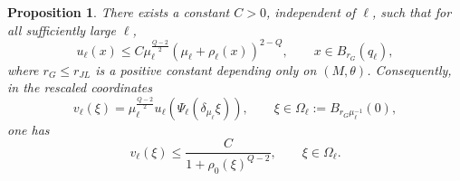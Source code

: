 \documentclass[11pt]{article}
\numberwithin{equation}{section}
\newtheorem{proposition}{Proposition}[section]
\numberwithin{equation}{section}
\begin{document}
	\begin{proposition}\label{propptwise}
		There exists a constant \(C>0\), independent of \(\ell\), such that for all sufficiently large \(\ell\),
		\begin{equation}\label{eq:pointwise-main}
			u_\ell(x) \le C\mu_\ell^{\frac{Q-2}{2}} (\mu_\ell+\rho_\ell(x))^{2-Q}, \qquad x\in B_{r_G}(q_\ell),
		\end{equation}
		where \(r_G\le r_{JL}\) is a positive constant depending only on \((M, \theta)\). Consequently, in the rescaled coordinates
		\[
		v_\ell(\xi)= \mu_\ell^{\frac{Q-2}{2}} u_\ell(\Psi_\ell(\delta_{\mu_\ell}\xi)), \qquad \xi\in\Omega_\ell:=B_{r_G\mu_\ell^{-1}}(0),
		\]
		one has
		\begin{equation}\label{eq:v-decay}
			v_\ell(\xi) \le \frac{C}{1+\rho_0(\xi)^{Q-2}}, \qquad \xi\in\Omega_\ell .
		\end{equation}
	\end{proposition}
	
\end{document}
